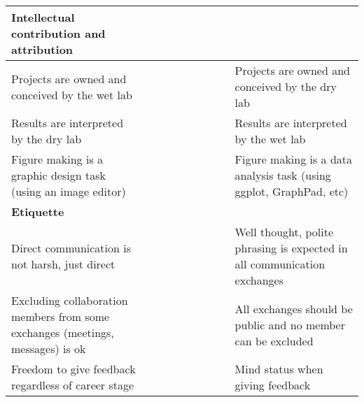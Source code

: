 \begin{table}[!ht]
\begin{adjustbox}{max width=\textwidth}
\begin{tabular}{|p{3in}|l|l|l|l|l|p{3in}|}
        \textbf{Intellectual contribution and attribution} & ~ & ~ & ~ & ~ & ~ & ~ \\ \hline
        Projects are owned and conceived by the wet lab & ~ & ~ & ~ & ~ & ~ & Projects are owned and conceived by the dry lab \\ \hline
        Results are interpreted by the dry lab & ~ & ~ & ~ & ~ & ~ & Results are interpreted by the wet lab \\ \hline
        Figure making is a graphic design task (using an image editor) & ~ & ~ & ~ & ~ & ~ & Figure making is a data analysis task (using ggplot, GraphPad, etc) \\ \hline
        \textbf{Etiquette} & ~ & ~ & ~ & ~ & ~ & ~ \\ \hline
        Direct communication is not harsh, just direct & ~ & ~ & ~ & ~ & ~ & Well thought, polite phrasing is expected in all communication exchanges \\ \hline
        Excluding collaboration members from some exchanges (meetings, messages) is ok & ~ & ~ & ~ & ~ & ~ & All exchanges should be public and no member can be excluded \\ \hline
        Freedom to give feedback regardless of career stage & ~ & ~ & ~ & ~ & ~ & Mind status when giving feedback \\ \hline
    \end{tabular}

    \end{adjustbox}
\end{table}